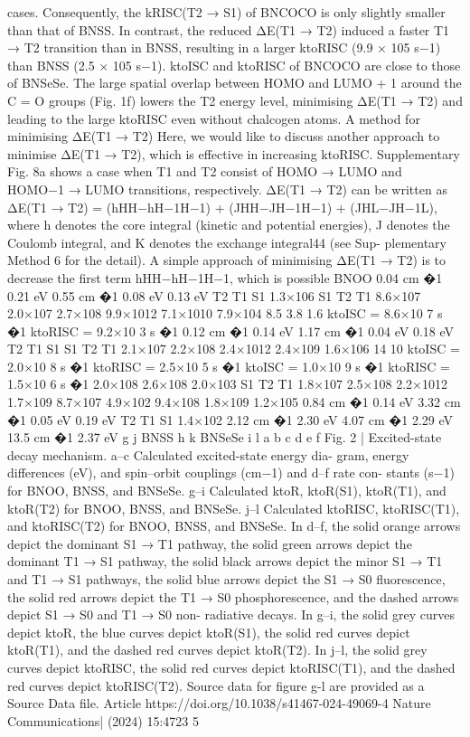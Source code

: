 cases. Consequently, the kRISC(T2 → S1) of BNCOCO is only slightly
smaller than that of BNSS. In contrast, the reduced ΔE(T1 → T2) induced
a faster T1 → T2 transition than in BNSS, resulting in a larger ktoRISC
(9.9 × 105 s−1) than BNSS (2.5 × 105 s−1). ktoISC and ktoRISC of BNCOCO are
close to those of BNSeSe. The large spatial overlap between HOMO and
LUMO + 1 around the C = O groups (Fig. 1f) lowers the T2 energy level,
minimising ΔE(T1 → T2) and leading to the large ktoRISC even without
chalcogen atoms.
A method for minimising ΔE(T1 → T2)
Here, we would like to discuss another approach to minimise
ΔE(T1 → T2), which is effective in increasing ktoRISC. Supplementary
Fig. 8a shows a case when T1 and T2 consist of HOMO → LUMO and
HOMO−1 → LUMO transitions, respectively. ΔE(T1 → T2) can be written
as
ΔE(T1 → T2) = (hHH−hH−1H−1) + (JHH−JH−1H−1) + (JHL−JH−1L),
where
h
denotes the core integral (kinetic and potential energies), J denotes the
Coulomb integral, and K denotes the exchange integral44 (see Sup-
plementary Method 6 for the detail). A simple approach of minimising
ΔE(T1 → T2) is to decrease the ﬁrst term hHH−hH−1H−1, which is possible
BNOO
0.04 cm
�1
0.21 eV 
0.55 cm
�1
0.08 eV
0.13 eV 
T2
T1
S1
1.3×106
S1
T2
T1
8.6×107
2.0×107
2.7×108
9.9×1012
7.1×1010
7.9×104
8.5
3.8
1.6
ktoISC = 8.6×10
7 s
�1  ktoRISC = 9.2×10
3 s
�1
0.12 cm
�1
0.14 eV 
1.17 cm
�1
0.04 eV 
0.18 eV 
T2
T1
S1
S1
T2
T1
2.1×107
2.2×108
2.4×1012
2.4×109
1.6×106
14
10
ktoISC = 2.0×10
8 s
�1  ktoRISC = 2.5×10
5 s
�1
ktoISC = 1.0×10
9 s
�1  ktoRISC = 1.5×10
6 s
�1
2.0×108
2.6×108
2.0×103
S1
T2
T1
1.8×107
2.5×108
2.2×1012
1.7×109
8.7×107
4.9×102
9.4×108
1.8×109
1.2×105
0.84 cm
�1
0.14 eV 
3.32 cm
�1
0.05 eV 
0.19 eV 
T2
T1
S1
1.4×102
2.12 cm
�1
2.30 eV 
4.07 cm
�1
2.29 eV 
13.5 cm
�1
2.37 eV 
g 
j 
BNSS
h 
k 
BNSeSe
i 
l 
a
b
c 
d
e
f 
Fig. 2 | Excited-state decay mechanism. a–c Calculated excited-state energy dia-
gram, energy differences (eV), and spin–orbit couplings (cm−1) and d–f rate con-
stants (s−1) for BNOO, BNSS, and BNSeSe. g–i Calculated ktoR, ktoR(S1), ktoR(T1), and
ktoR(T2) for BNOO, BNSS, and BNSeSe. j–l Calculated ktoRISC, ktoRISC(T1), and
ktoRISC(T2) for BNOO, BNSS, and BNSeSe. In d–f, the solid orange arrows depict the
dominant S1 → T1 pathway, the solid green arrows depict the dominant T1 → S1
pathway, the solid black arrows depict the minor S1 → T1 and T1 → S1 pathways, the
solid blue arrows depict the S1 → S0 ﬂuorescence, the solid red arrows depict the
T1 → S0 phosphorescence, and the dashed arrows depict S1 → S0 and T1 → S0 non-
radiative decays. In g–i, the solid grey curves depict ktoR, the blue curves depict
ktoR(S1), the solid red curves depict ktoR(T1), and the dashed red curves depict
ktoR(T2). In j–l, the solid grey curves depict ktoRISC, the solid red curves depict
ktoRISC(T1), and the dashed red curves depict ktoRISC(T2). Source data for ﬁgure g-l
are provided as a Source Data ﬁle.
Article
https://doi.org/10.1038/s41467-024-49069-4
Nature Communications|        (2024) 15:4723 
5



